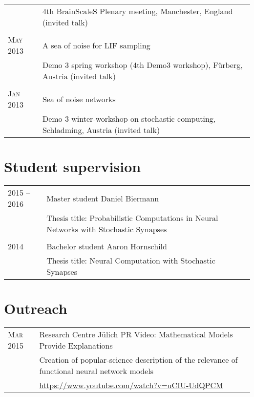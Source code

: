 \documentclass[a4paper,10pt]{article}
\begin{document}
\begin{longtable}{>{\hfill}p{1.6cm}|p{}}
  & \footnotesize 4th BrainScaleS Plenary meeting, Manchester, England  (invited talk)\\
  \multicolumn{2}{c}{} \\
  \textsc{May} 2013 & A sea of noise for LIF sampling \\
  & \footnotesize Demo 3 spring workshop (4th Demo3 workshop), F\"urberg, Austria  (invited talk)\\
  \multicolumn{2}{c}{} \\
  \textsc{Jan} 2013 & Sea of noise networks \\
  & \footnotesize Demo 3 winter-workshop on stochastic computing, Schladming, Austria (invited talk)\\
\end{longtable}

\section{Student supervision}
\begin{longtable}{>{\hfill}p{1.8cm}|p{11.4cm}}
  2015 -- 2016 & Master student Daniel Biermann \\
  & \footnotesize  Thesis title: Probabilistic Computations in Neural Networks with Stochastic Synapses \\
  \multicolumn{2}{c}{} \\
  2014 & Bachelor student Aaron Hornschild \\
  & \footnotesize Thesis title: Neural Computation with Stochastic Synapses \\
\end{longtable}

\section{Outreach}
\begin{longtable}{>{\hfill}p{3.15cm}|p{10.4cm}}
  \textsc{Mar} 2015 & Research Centre J\"ulich PR Video: Mathematical Models Provide Explanations \\
                    & \footnotesize Creation of popular-science description of the relevance of functional neural network models \\
                    & \footnotesize \href{https://www.youtube.com/watch?v=uCIU-UdQPCM}{https://www.youtube.com/watch?v=uCIU-UdQPCM}
\end{longtable}

\newif\ifpublications
\publicationstrue

\ifpublications
\newpage

\fi
\end{document}
